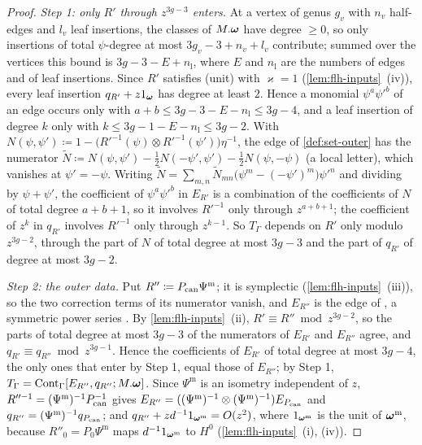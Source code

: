 \begin{proof}
\emph{Step 1: only $R'$ through $z^{3g-3}$ enters.} At a vertex of genus $g_v$ with $n_v$ half-edges and $l_v$ leaf insertions, the classes of $M.\boldsymbol{\omega}$ have degree $\geq0$, so only insertions of total $\psi$-degree at most $3g_v-3+n_v+l_v$ contribute; summed over the vertices this bound is $3g-3-E+n_{\mathrm l}$, where $E$ and $n_{\mathrm l}$ are the numbers of edges and of leaf insertions. Since $R'$ satisfies (unit) with $\varkappa=1$ (\cref{lem:flh-inputs}~(iv)), every leaf insertion $q_{R'}+z1_{\boldsymbol{\omega}}$ has degree at least $2$. Hence a monomial $\psi^a\psi'^b$ of an edge occurs only with $a+b\leq 3g-3-E-n_{\mathrm l}\leq 3g-4$, and a leaf insertion of degree $k$ only with $k\leq 3g-1-E-n_{\mathrm l}\leq 3g-2$. With $N(\psi,\psi')\coloneqq1-\bigl(R'^{-1}(\psi)\otimes R'^{-1}(\psi')\bigr)\eta^{-1}$, the edge of \cref{def:set-outer} has the numerator $\tilde N\coloneqq N(\psi,\psi')-\frac12N(-\psi',\psi')-\frac12N(\psi,-\psi)$ (a local letter), which vanishes at $\psi'=-\psi$. Writing $\tilde N=\sum_{m,n}\tilde N_{mn}\bigl(\psi^m-(-\psi')^m\bigr)\psi'^n$ and dividing by $\psi+\psi'$, the coefficient of $\psi^a\psi'^b$ in $E_{R'}$ is a combination of the coefficients of $N$ of total degree $a+b+1$, so it involves $R'^{-1}$ only through $z^{a+b+1}$; the coefficient of $z^k$ in $q_{R'}$ involves $R'^{-1}$ only through $z^{k-1}$. So $T_\Gamma$ depends on $R'$ only modulo $z^{3g-2}$, through the part of $N$ of total degree at most $3g-3$ and the part of $q_{R'}$ of degree at most $3g-2$.

\emph{Step 2: the outer data.} Put $R''\coloneqq P_{\mathrm{can}}\Psi^{\mathrm m}$; it is symplectic (\cref{lem:flh-inputs}~(iii)), so the two correction terms of its numerator vanish, and $E_{R''}$ is the edge of \cite[Def.~2.2]{PPZ15}, a symmetric power series \cite[Rem.~2.1 and (6)]{PPZ15}. By \cref{lem:flh-inputs}~(ii), $R'\equiv R''\bmod z^{3g-2}$, so the parts of total degree at most $3g-3$ of the numerators of $E_{R'}$ and $E_{R''}$ agree, and $q_{R'}\equiv q_{R''}\bmod z^{3g-1}$. Hence the coefficients of $E_{R'}$ of total degree at most $3g-4$, the only ones that enter by Step 1, equal those of $E_{R''}$; by Step 1, $T_\Gamma=\mathrm{Cont}_\Gamma[E_{R''},q_{R''};M.\boldsymbol{\omega}]$. Since $\Psi^{\mathrm m}$ is an isometry independent of $z$, $R''^{-1}=(\Psi^{\mathrm m})^{-1}P_{\mathrm{can}}^{-1}$ gives $E_{R''}=((\Psi^{\mathrm m})^{-1}\otimes(\Psi^{\mathrm m})^{-1})E_{P_{\mathrm{can}}}$ and $q_{R''}=(\Psi^{\mathrm m})^{-1}q_{P_{\mathrm{can}}}$; and $q_{R''}+zd^{-1}1_{\boldsymbol{\omega}^{\mathrm m}}=O(z^2)$, where $1_{\boldsymbol{\omega}^{\mathrm m}}$ is the unit of $\boldsymbol{\omega}^{\mathrm m}$, because $R''_0=P_0\Psi^{\mathrm m}$ maps $d^{-1}1_{\boldsymbol{\omega}^{\mathrm m}}$ to $H^0$ (\cref{lem:flh-inputs}~(i), (iv)).


\end{proof}
